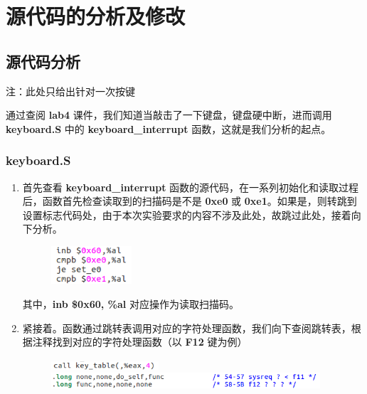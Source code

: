 \section{源代码的分析及修改}
    \subsection{源代码分析}
        \par 注：此处只给出针对一次按键
        \par 通过查阅 \textbf{lab4} 课件，我们知道当敲击了一下键盘，键盘硬中断，进而调用 \textbf{keyboard.S} 中的 \textbf{keyboard\_interrupt} 函数，这就是我们分析的起点。
        \subsubsection{keyboard.S}
            \begin{enumerate}
                \item 首先查看 \textbf{keyboard\_interrupt} 函数的源代码，在一系列初始化和读取过程后，函数首先检查读取到的扫描码是不是 \textbf{0xe0} 或 \textbf{0xe1}。如果是，则转跳到设置标志代码处，由于本次实验要求的内容不涉及此处，故跳过此处，接着向下分析。
                    \begin{figure}[htbp]
                        \hspace*{1.5cm}
                        \includegraphics*[width = 3cm]{s0_0.png}
                    \end{figure}
                    \par 其中，\textbf{inb \$0x60, \%al} 对应操作为读取扫描码。
                \item 紧接着。函数通过跳转表调用对应的字符处理函数，我们向下查阅跳转表，根据注释找到对应的字符处理函数（以 \textbf{F12} 键为例）
                    \begin{figure}[htbp]
                        \hspace*{1.5cm}
                        \includegraphics*[width = 4cm]{s0_1_0.png} \\
                        \hspace*{1.5cm}
                        \includegraphics*[width = 10cm]{s0_1_1.png} 

\end{figure}
\end{enumerate}
